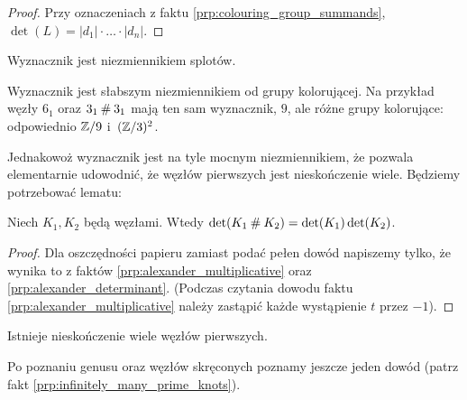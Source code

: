\begin{proof}
    Przy oznaczeniach z faktu \ref{prp:colouring_group_summands}, $\det(L) = |d_1| \cdot \ldots \cdot |d_n|$.
\end{proof}

\begin{corollary}
%
\label{cor:determinant_invariant}%
    Wyznacznik jest niezmiennikiem splotów.
\end{corollary}

Wyznacznik jest słabszym niezmiennikiem od grupy kolorującej.
Na przykład węzły $6_1$ oraz $3_1 \mathbin{\#} 3_1$ mają ten sam wyznacznik, $9$, ale różne grupy kolorujące: odpowiednio $\mathbb Z/9$ i~$(\mathbb Z/3)^2$.

Jednakowoż wyznacznik jest na tyle mocnym niezmiennikiem, że pozwala elementarnie udowodnić, że węzłów pierwszych jest nieskończenie wiele.
Będziemy potrzebować lematu:

\begin{lemma}
    Niech $K_1, K_2$ będą węzłami.
    Wtedy $\det(K_1 \mathbin{\#} K_2) = \det(K_1) \det(K_2)$.
\end{lemma}

\begin{proof}
    Dla oszczędności papieru zamiast podać pełen dowód napiszemy tylko, że wynika to z faktów \ref{prp:alexander_multiplicative} oraz \ref{prp:alexander_determinant}.
    (Podczas czytania dowodu faktu \ref{prp:alexander_multiplicative} należy zastąpić każde wystąpienie $t$ przez $-1$).
\end{proof}

\begin{proposition}
\label{prop:infinite_prime_knots_1}%
    Istnieje nieskończenie wiele węzłów pierwszych.
\end{proposition}

Po poznaniu genusu oraz węzłów skręconych poznamy jeszcze jeden dowód (patrz fakt \ref{prp:infinitely_many_prime_knots}).

